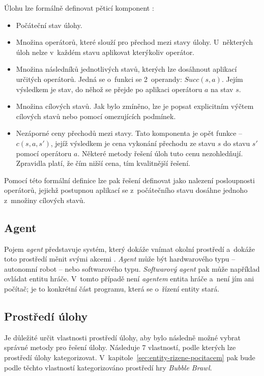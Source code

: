 Úlohu lze formálně definovat pěticí komponent \cite{AI_Russel_Norvig}:
\begin{itemize}
    \item Počáteční stav úlohy.
    \item Množina operátorů, které slouží pro přechod mezi stavy úlohy. U~některých úloh nelze v~každém stavu aplikovat kterýkoliv operátor.
    \item Množina následníků jednotlivých stavů, kterých lze dosáhnout aplikací určitých operátorů. Jedná se o~funkci se 2~operandy: ${Succ(s, a)}$. Jejím výsledkem je stav, do něhož se přejde po aplikaci operátoru $a$ na stav $s$.
    \item Množina cílových stavů. Jak bylo zmíněno, lze je popsat explicitním výčtem cílových stavů nebo pomocí omezujících podmínek.
    \item Nezáporné ceny přechodů mezi stavy. Tato komponenta je opět funkce -- ${c(s, a, s')}$, jejíž výsledkem je cena vykonání přechodu ze stavu $s$ do stavu $s'$ pomocí operátoru $a$. Některé metody řešení úloh tuto cenu nezohledňují. Zpravidla platí, že čím nižší cena, tím kvalitnější řešení.
\end{itemize}
Pomocí této formální definice lze pak řešení definovat jako nalezení posloupnosti operátorů, jejichž postupnou aplikací se z~počátečního stavu dosáhne jednoho z~množiny cílových stavů.

\subsection*{Agent}

Pojem \emph{agent} představuje systém, který dokáže vnímat okolní prostředí a~dokáže toto prostředí měnit svými akcemi \cite{AI_Ertel, AI_Russel_Norvig}. \emph{Agent} může být hardwarového typu -- autonomní robot -- nebo softwarového typu. \emph{Softwarový agent} pak může například ovládat entitu hráče. V~tomto případě není \emph{agentem} entita hráče a~není jím ani počítač; je to konkrétní část programu, která se o~řízení entity stará.

\subsection*{Prostředí úlohy}

Je důležité určit vlastnosti prostředí úlohy, aby bylo následně možné vybrat správné metody pro řešení úlohy. Následuje 7 vlastností, podle kterých lze prostředí úlohy kategorizovat. V~kapitole~\ref{sec:entity-rizene-pocitacem} pak bude podle těchto vlastností kategorizováno prostředí hry \emph{Bubble Brawl}.

